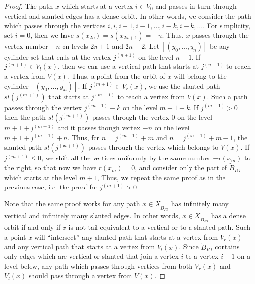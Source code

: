 \documentclass[10pt,a4paper]{amsart}
\def\tl{\widetilde}
\begin{document}
\begin{proof}
     The path $x$ which starts at a vertex $i \in V_0$ and passes in turn through vertical and slanted edges has a dense orbit. In other words, we consider the path which passes through the vertices $i, i, i - 1, i - 1, \ldots, i - k, i - k, \ldots$. 
     For simplicity, set $i = 0$, then we have $s(x_{2n}) = s(x_{2n + 1}) = -n$. Thus, $x$ passes through the vertex number $-n$ on levels $2n+1$ and $2n+2$. 
      Let $[(y_0, \ldots, y_n)]$ be any cylinder set that ends at the vertex $j^{(n+1)}$ on the level $n + 1$. If $j^{(n+1)} \in V_{l}(x)$, then we can use a vertical path that starts at $j^{(n+1)}$ to reach a vertex from $V(x)$. Thus, a point from the orbit of $x$ will belong to the cylinder $[(y_0, \ldots, y_m)]$. If $j^{(m+1)} \in V_{r}(x)$, we use the slanted path $sl(j^{(m+1)})$ that starts at $j^{(m+1)}$ to reach a vertex from $V(x)$. Such a path passes through the vertex $j^{(m+1)} - k$ on the level $m + 1 + k$.  If $j^{(m+1)} > 0$ then the path $sl(j^{(m+1)})$ passes through the vertex $0$ on the level $m + 1 + j^{(m+1)}$ and it passes though vertex $-n$ on the level $m + 1 + j^{(m+1)} + n$. Thus, for $n = j^{(m+1)} + m$ and $n = j^{(m+1)} + m - 1$, the slanted path $sl(j^{(m+1)})$ passes through the vertex which belongs to $V(x)$. If $j^{(m+1)} \leq 0$, we shift all the vertices uniformly by the same number $-r(x_m)$ to the right, so that now we have $r(x_m) = 0$, and consider only the part of $\tl B_{IO}$ which starts at the level $m+1$, Thus, we repeat the same proof as in the previous case, i.e. the proof for $j^{(m+1)} > 0$.  

      Note that the same proof works for any path $x \in X_{\tl B_{IO}}$ has infinitely many vertical and infinitely many slanted edges. In other words, $x \in X_{\tl B_{IO}}$ has a dense orbit if and only if $x$ is not tail equivalent to a vertical or to a slanted path. Such a point $x$ will ``intersect'' any slanted path that starts at a vertex from $V_r(x)$ and any vertical path that starts at a vertex from $V_{l}(x)$. Since $\tl B_{IO}$ contains only edges which are vertical or slanted that join a vertex $i$ to a vertex $i - 1$ on a level below, any path which passes through vertices from both $V_r(x)$ and $V_l(x)$ should pass through a vertex from $V(x)$. 
\end{proof}
\end{document}
